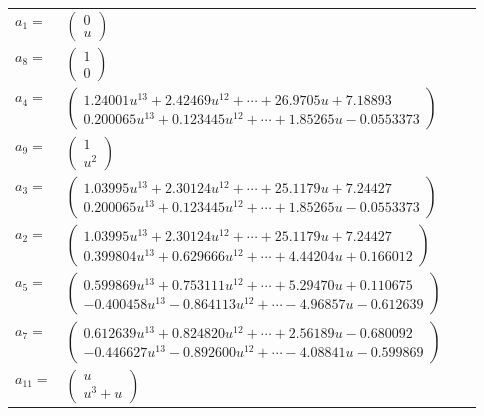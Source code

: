 \documentclass[1p]{elsarticle_modified}
\theoremstyle{definition}
\begin{document}
\begin{tabular}{m{7pt} m{180pt} m{7pt} m{180pt} }
\flushright $a_{1}=$&$\begin{pmatrix}0\\u\end{pmatrix}$ \\
\flushright $a_{8}=$&$\begin{pmatrix}1\\0\end{pmatrix}$ \\
\flushright $a_{4}=$&$\begin{pmatrix}1.24001 u^{13}+2.42469 u^{12}+\cdots+26.9705 u+7.18893\\0.200065 u^{13}+0.123445 u^{12}+\cdots+1.85265 u-0.0553373\end{pmatrix}$ \\
\flushright $a_{9}=$&$\begin{pmatrix}1\\u^2\end{pmatrix}$ \\
\flushright $a_{3}=$&$\begin{pmatrix}1.03995 u^{13}+2.30124 u^{12}+\cdots+25.1179 u+7.24427\\0.200065 u^{13}+0.123445 u^{12}+\cdots+1.85265 u-0.0553373\end{pmatrix}$ \\
\flushright $a_{2}=$&$\begin{pmatrix}1.03995 u^{13}+2.30124 u^{12}+\cdots+25.1179 u+7.24427\\0.399804 u^{13}+0.629666 u^{12}+\cdots+4.44204 u+0.166012\end{pmatrix}$ \\
\flushright $a_{5}=$&$\begin{pmatrix}0.599869 u^{13}+0.753111 u^{12}+\cdots+5.29470 u+0.110675\\-0.400458 u^{13}-0.864113 u^{12}+\cdots-4.96857 u-0.612639\end{pmatrix}$ \\
\flushright $a_{7}=$&$\begin{pmatrix}0.612639 u^{13}+0.824820 u^{12}+\cdots+2.56189 u-0.680092\\-0.446627 u^{13}-0.892600 u^{12}+\cdots-4.08841 u-0.599869\end{pmatrix}$ \\
\flushright $a_{11}=$&$\begin{pmatrix}u\\u^3+u\end{pmatrix}$ \\

\end{tabular}
\end{document}
